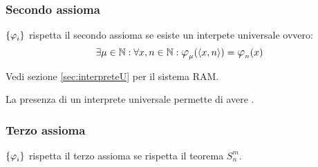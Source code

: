 \subsubsection*{Secondo assioma}
$\sistProg$ rispetta il secondo assioma se esiste un interpete universale ovvero:
$$ \exists\mu\in\N : \forall x,n\in\N: \semRAM_\mu(\cantor{x,n})=
\semRAM_n(x) $$

Vedi sezione \ref{sec:interpreteU} per il sistema RAM.

La presenza di un interprete universale permette di avere .

\subsubsection*{Terzo assioma}
$\sistProg$ rispetta il terzo assioma se rispetta il teorema $S_n^m$.

